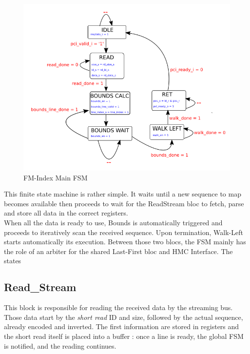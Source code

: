 \begin{minipage}[t]{0.45\textwidth}
\begin{figure}[H]
    \centering
    \hspace*{-25mm}\includegraphics[scale = 0.5]{Figures/FM_FSM.png}
    \caption{FM-Index Main FSM}
    \label{fig:fm_fsm}
\end{figure}
\end{minipage}
\hfill
\begin{minipage}[t]{0.4\textwidth}
This finite state machine is rather simple. It waits until a new sequence to map becomes available then proceeds to wait for the ReadStream bloc to fetch, parse and store all data in the correct registers. \\

When all the data is ready to use, Bounds is automatically triggered and proceeds to iteratively scan the received sequence. Upon termination, Walk-Left starts automatically its execution. Between those two blocs, the FSM mainly has the role of an arbiter for the shared Last-First bloc and HMC Interface. The states

\end{minipage}


\subsection{Read\_Stream}



This block is responsible for reading the received data by the streaming bus. Those data start by the \textsl{short read} ID and size, followed by the actual sequence, already encoded and inverted. The first information are stored in registers and the short read itself is placed into a buffer : once a line is ready, the global FSM is notified, and the reading continues. \\
\vspace*{8mm}

